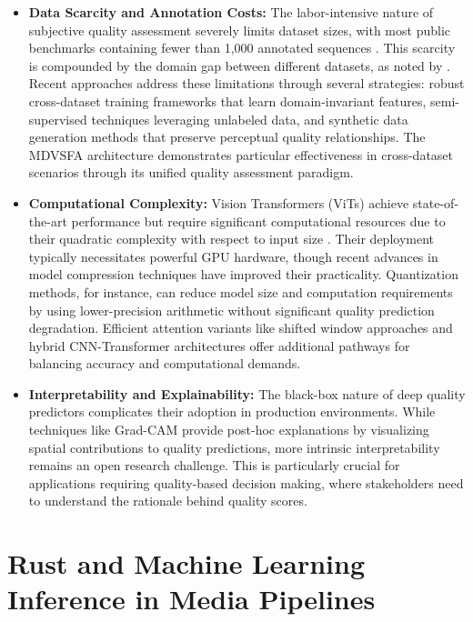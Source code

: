 \begin{itemize}  
    \item \textbf{Data Scarcity and Annotation Costs:} The labor-intensive nature of subjective quality assessment severely limits dataset sizes, with most public benchmarks containing fewer than 1,000 annotated sequences \cite{hosu2020konvid}. This scarcity is compounded by the domain gap between different datasets, as noted by \cite{li2023unified}. Recent approaches address these limitations through several strategies: robust cross-dataset training frameworks that learn domain-invariant features, semi-supervised techniques leveraging unlabeled data, and synthetic data generation methods that preserve perceptual quality relationships. The MDVSFA architecture \cite{li2023unified} demonstrates particular effectiveness in cross-dataset scenarios through its unified quality assessment paradigm.
    
    \item \textbf{Computational Complexity:} Vision Transformers (ViTs) achieve state-of-the-art performance but require significant computational resources due to their quadratic complexity with respect to input size \cite{liu2021swin}. Their deployment typically necessitates powerful GPU hardware, though recent advances in model compression techniques have improved their practicality. Quantization methods, for instance, can reduce model size and computation requirements by using lower-precision arithmetic without significant quality prediction degradation. Efficient attention variants like shifted window approaches and hybrid CNN-Transformer architectures offer additional pathways for balancing accuracy and computational demands.
    
    \item \textbf{Interpretability and Explainability:} The black-box nature of deep quality predictors complicates their adoption in production environments. While techniques like Grad-CAM \cite{selvaraju2017grad} provide post-hoc explanations by visualizing spatial contributions to quality predictions, more intrinsic interpretability remains an open research challenge. This is particularly crucial for applications requiring quality-based decision making, where stakeholders need to understand the rationale behind quality scores.
\end{itemize}  

\section{Rust and Machine Learning Inference in Media Pipelines}

